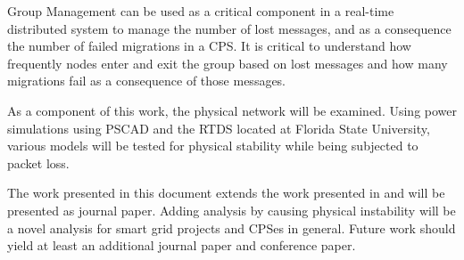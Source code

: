 Group Management can be used as a critical component in a real-time distributed system to manage the number of lost messages, and as a consequence the number of failed migrations in a CPS. It is critical to understand how frequently nodes enter and exit the group based on lost messages and how many migrations fail as a consequence of those messages.

As a component of this work, the physical network will be examined. Using power simulations using PSCAD and the RTDS located at Florida State University, various models will be tested for physical stability while being subjected to packet loss.

The work presented in this document extends the work presented in \cite{CRITIS2012} and will be presented as journal paper. Adding analysis by causing physical instability will be a novel analysis for smart grid projects and CPSes in general. Future work should yield at least an additional journal paper and conference paper.
